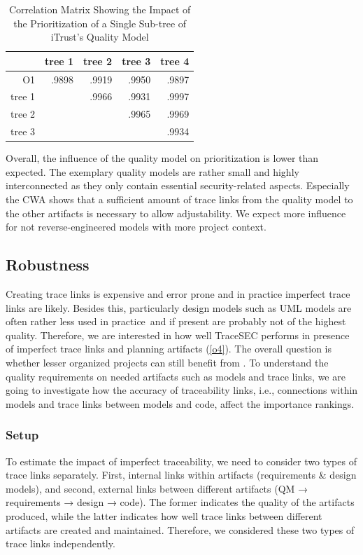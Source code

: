 \begin{table}
    \centering
    \caption{Correlation Matrix Showing the Impact of the Prioritization of a Single Sub-tree of iTrust's Quality Model}
    \label{tab:trees}
    \begin{tabular}{r|rrrr}
        \toprule
         & tree 1 & tree 2 & tree 3 & tree 4  \\
         \midrule
        O1 & .9898 & .9919 & .9950 & .9897 \\
        tree 1 & & .9966 &	.9931 & .9997 \\
        tree 2 & & & .9965 &	.9969 \\
        tree 3 & & & & .9934 \\
        \bottomrule
    \end{tabular}
\end{table}


Overall, the influence of the quality model on prioritization is lower than expected.
The exemplary quality models are rather small and highly interconnected as they only contain essential security-related aspects.
Especially the CWA shows that a sufficient amount of trace links from the quality model to the other artifacts is necessary to allow adjustability.
We expect more influence for not reverse-engineered models with more project context.

\subsection{Robustness}

	Creating trace links is expensive and error prone and in practice imperfect trace links are likely.
	Besides this, particularly design models such as UML models are often rather less used in practice\,\cite{Gorschek2014} and if present are probably not of the highest quality.
	Therefore, we are interested in how well TraceSEC performs in presence of imperfect trace links and planning artifacts (\ref{o4}).
	The overall question is whether lesser organized projects can still benefit from \appr{}.
	To understand the quality requirements on needed artifacts such as models and trace links, we are going to investigate how the accuracy of traceability links, i.e., connections within models and trace links between models and code, affect the importance rankings.

\subsubsection{Setup}
	To estimate the impact of imperfect traceability, we need to consider two types of trace links separately.
	First, internal links within artifacts (requirements \& design models), and second, external links between different artifacts (QM → requirements → design → code).
	The former indicates the quality of the artifacts produced, while the latter indicates how well trace links between different artifacts are created and maintained.
	Therefore, we considered these two types of trace links independently.




